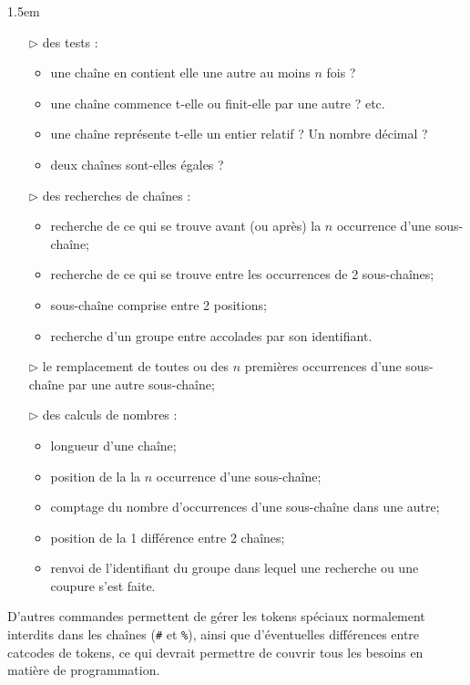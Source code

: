 \documentclass[a4paper,10pt,french]{article}
\begin{document}
\begin{titlepage}
\begin{center}
\begin{minipage}{0.85\linewidth}
			\parindent1.5em
			\begin{itemize}
				\item[$\triangleright$] des tests :
					\begin{itemize}
						\item une chaîne en contient elle une autre au moins $n$ fois ?
						\item une chaîne commence t-elle ou finit-elle par une autre ? etc.
						\item une chaîne représente t-elle un entier relatif ? Un nombre décimal ?
						\item deux chaînes sont-elles égales ?
					\end{itemize}
				\item[$\triangleright$] des recherches de chaînes :
					\begin{itemize}
						\item recherche de ce qui se trouve avant (ou après) la $n$\ieme{} occurrence d'une sous-chaîne;
						\item recherche de ce qui se trouve entre les occurrences de 2 sous-chaînes;
						\item sous-chaîne comprise entre 2 positions;
						\item recherche d'un groupe entre accolades par son identifiant.
					\end{itemize}
				\item[$\triangleright$] le remplacement de toutes ou des $n$ premières occurrences d'une sous-chaîne par une autre sous-chaîne;
				\item[$\triangleright$] des calculs de nombres :
					\begin{itemize}
						\item longueur d'une chaîne;
						\item position de la la $n$\ieme{} occurrence d'une sous-chaîne;
						\item comptage du nombre d'occurrences d'une sous-chaîne dans une autre;
						\item position de la 1\iere{} différence entre 2 chaînes;
						\item renvoi de l'identifiant du groupe dans lequel une recherche ou une coupure s'est faite.
					\end{itemize}
			\end{itemize}
			\setlength{\parindent}{0pt}
			\medskip
			D'autres commandes permettent de gérer les tokens spéciaux normalement interdits dans les chaînes (\verb|#| et \verb|%|), ainsi que d'éventuelles différences entre catcodes de tokens, ce qui devrait permettre de couvrir tous les besoins en matière de programmation.
		\end{minipage}
	\end{center}
	\hrulefill\vfill{}
\end{titlepage}
\end{document}
